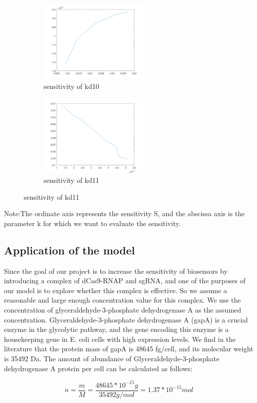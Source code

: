 \begin{figure}[H]
\begin{subfigure}{0.5\textwidth}
			\includegraphics[height=4cm]{d10.png}
			\caption{sensitivity of kd10}
		\end{subfigure}%
		\begin{subfigure}{0.5\textwidth}
			\includegraphics[height=4cm]{d11.png}
			\caption{sensitivity of kd11}
		\end{subfigure}
\end{figure}

Note:The ordinate axis represents the sensitivity S, and the abscissa axis is the parameter k for which we want to evaluate the sensitivity.

\subsection{Application of the model}
Since the goal of our project is to increase the sensitivity of biosensors by introducing a complex of dCas9-RNAP and sgRNA, and one of the purposes of our model is to explore whether this complex is effective. So we assume a reasonable and large enough concentration value for this complex. We use the concentration of glyceraldehyde-3-phosphate dehydrogenase A as the assumed concentration. Glyceraldehyde-3-phosphate dehydrogenase A (gapA) is a crucial enzyme in the glycolytic pathway, and the gene encoding this enzyme is a housekeeping gene in E. coli cells with high expression levels. We find in the literature that the protein mass of gapA is 48645 fg/cell, and its molecular weight is 35492 Da.\cite{ishihama2005exponentially} The amount of abundance of Glyceraldehyde-3-phosphate dehydrogenase A protein per cell can be calculated as follows:

\begin{displaymath}
	n=\frac{m}{M}=\frac{48645*10^{-15}g}{35492g/mol}=1.37*10^{-15}mol
\end{displaymath}

